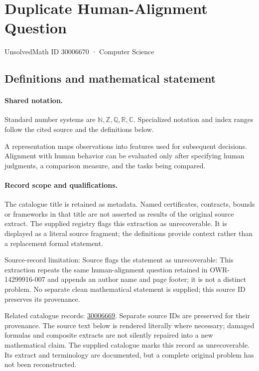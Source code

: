 \documentclass[11pt]{article}
\begin{document}
\setcounter{section}{30006669}
\section{Duplicate Human-Alignment Question}\label{30006670}
{\small\sffamily UnsolvedMath ID 30006670 · Computer Science}
\subsection{Definitions and mathematical statement}

\paragraph{Shared notation.}Standard number systems are $\mathbb N,\mathbb Z,\mathbb Q,\mathbb R,\mathbb C$. Specialized notation and index ranges follow the cited source and the definitions below.


A representation maps observations into features used for subsequent decisions. Alignment with human behavior can be evaluated only after specifying human judgments, a comparison measure, and the tasks being compared.
\paragraph{Record scope and qualifications.}
The catalogue title is retained as metadata. Named certificates, contracts, bounds or frameworks in that title are not asserted as results of the original source extract.
The supplied registry flags this extraction as unrecoverable. It is displayed as a literal source fragment; the definitions provide context rather than a replacement formal statement.

Source-record limitation: Source flags the statement as unrecoverable: This extraction repeats the same human-alignment question retained in OWR-14299916-007 and appends an author name and page footer; it is not a distinct problem. No separate clean mathematical statement is supplied; this source ID preserves its provenance.

Related catalogue records: \href{https://mehmetmars7.github.io/Erdosproblems-llm-hunter/problem.html?type=open_problems&id=30006669}{30006669}. Separate source IDs are preserved for their provenance.
The source text below is rendered literally where necessary; damaged formulas and composite extracts are not silently repaired into a new mathematical claim.
The supplied catalogue marks this record as unrecoverable. Its extract and terminology are documented, but a complete original problem has not been reconstructed.
\end{document}
